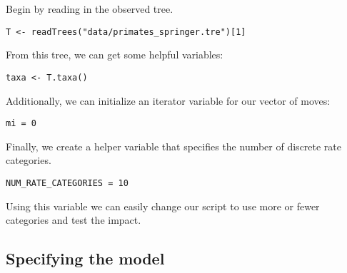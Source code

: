 Begin by reading in the observed tree. 

{\tt \begin{snugshade*}
\begin{lstlisting}
T <- readTrees("data/primates_springer.tre")[1]
\end{lstlisting}
\end{snugshade*}}

From this tree, we can get some helpful variables:
{\tt \begin{snugshade*}
\begin{lstlisting}
taxa <- T.taxa()
\end{lstlisting}
\end{snugshade*}}

Additionally, we can initialize an iterator variable for our vector of moves:
{\tt \begin{snugshade*}
\begin{lstlisting}
mi = 0
\end{lstlisting}
\end{snugshade*}}

Finally, we create a helper variable that specifies the number of discrete rate categories.
{\tt \begin{snugshade*}
\begin{lstlisting}
NUM_RATE_CATEGORIES = 10
\end{lstlisting}
\end{snugshade*}}
Using this variable we can easily change our script to use more or fewer categories and test the impact.



\subsection{Specifying the model}

